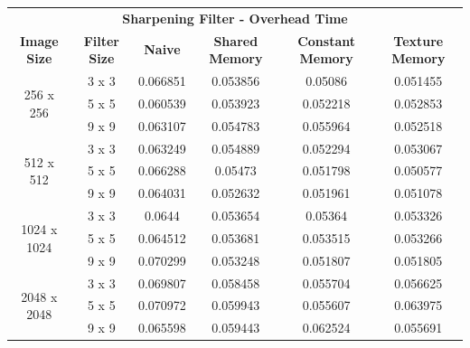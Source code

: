 \documentclass[10pt]{article}
\begin{document}
\newpage
\begin{table}[H]
\small
\begin{tabular}{cccccc}
\multicolumn{6}{c}{\textbf{Sharpening Filter - Overhead Time}}                                                                                     \\
\textbf{Image Size}          & \textbf{Filter Size} & \textbf{Naive} & \textbf{Shared Memory} & \textbf{Constant Memory} & \textbf{Texture Memory} \\ \hline
\multirow{3}{*}{256 x 256}   & 3 x 3                & 0.066851       & 0.053856               & 0.05086                  & 0.051455                \\
                             & 5 x 5                & 0.060539       & 0.053923               & 0.052218                 & 0.052853                \\
                             & 9 x 9                & 0.063107       & 0.054783               & 0.055964                 & 0.052518                \\ \hline
\multirow{3}{*}{512 x 512}   & 3 x 3                & 0.063249       & 0.054889               & 0.052294                 & 0.053067                \\
                             & 5 x 5                & 0.066288       & 0.05473                & 0.051798                 & 0.050577                \\
                             & 9 x 9                & 0.064031       & 0.052632               & 0.051961                 & 0.051078                \\ \hline
\multirow{3}{*}{1024 x 1024} & 3 x 3                & 0.0644         & 0.053654               & 0.05364                  & 0.053326                \\
                             & 5 x 5                & 0.064512       & 0.053681               & 0.053515                 & 0.053266                \\
                             & 9 x 9                & 0.070299       & 0.053248               & 0.051807                 & 0.051805                \\ \hline
\multirow{3}{*}{2048 x 2048} & 3 x 3                & 0.069807       & 0.058458               & 0.055704                 & 0.056625                \\
                             & 5 x 5                & 0.070972       & 0.059943               & 0.055607                 & 0.063975                \\
                             & 9 x 9                & 0.065598       & 0.059443               & 0.062524                 & 0.055691               
\end{tabular}
\end{table}
\end{document}
